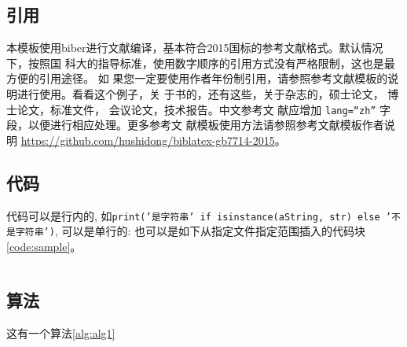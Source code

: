 \subsection{引用}
本模板使用biber进行文献编译，基本符合2015国标的参考文献格式。默认情况下，按照国
科大的指导标准，使用数字顺序的引用方式没有严格限制，这也是最方便的引用途径。 如
果您一定要使用作者年份制引用，请参照参考文献模板的说明进行使用。看看这个例子，关
于书的\cite{tex, companion, ColdSources}，还有这些\cite{Krasnogor2004e, clzs,
zjsw}，关于杂志的\cite{ELIDRISSI94, MELLINGER96, SHELL02}，硕士论文\cite{zhubajie, metamori2004}，
博士论文\cite{shaheshang, FistSystem01}，标准文件\cite{IEEE-1363}，
会议论文\cite{DPMG,kocher99}，技术报告\cite{NPB2}。中文参考文
献\cite{cnarticle}应增加 \texttt{lang=``zh''} 字段，以便进行相应处理。更多参考文
献模板使用方法请参照参考文献模板作者说明
\url{https://github.com/hushidong/biblatex-gb7714-2015}。

\subsection{代码}

代码可以是行内的, 如\texttt{print('是字符串' if isinstance(aString, str) else '不是字符串')}, 可以是单行的:
也可以是如下从指定文件指定范围插入的代码块\autoref{code:sample}。
\begin{listing}[H]
    \inputminted[firstline=16, lastline=37]{c}{assets/example.c}
    \label{code:sample}
\end{listing}

\subsection{算法}

这有一个算法\ref{alg:alg1}

